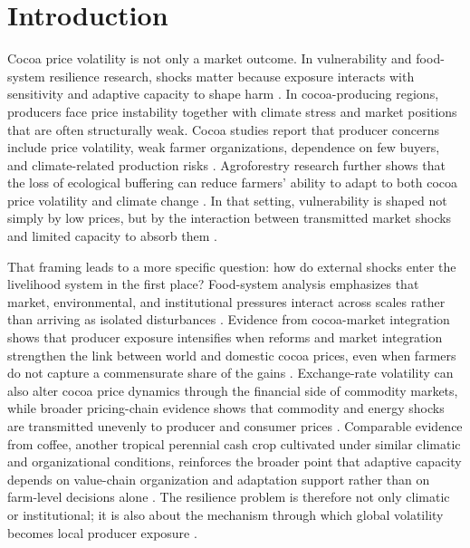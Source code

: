 \documentclass[11pt]{article}
\begin{document}
\section{Introduction}

Cocoa price volatility is not only a market outcome. In vulnerability and food-system resilience research, shocks matter because exposure interacts with sensitivity and adaptive capacity to shape harm \citep{Tendall2015,Zurek2022}. In cocoa-producing regions, producers face price instability together with climate stress and market positions that are often structurally weak. Cocoa studies report that producer concerns include price volatility, weak farmer organizations, dependence on few buyers, and climate-related production risks \citep{Mithofer2017,AkrofiAtitianti2018}. Agroforestry research further shows that the loss of ecological buffering can reduce farmers' ability to adapt to both cocoa price volatility and climate change \citep{Vaast2014}. In that setting, vulnerability is shaped not simply by low prices, but by the interaction between transmitted market shocks and limited capacity to absorb them \citep{Turner2003,Adger2006,TsowouGayi2019}.

That framing leads to a more specific question: how do external shocks enter the livelihood system in the first place? Food-system analysis emphasizes that market, environmental, and institutional pressures interact across scales rather than arriving as isolated disturbances \citep{Ericksen2008,Zurek2022}. Evidence from cocoa-market integration shows that producer exposure intensifies when reforms and market integration strengthen the link between world and domestic cocoa prices, even when farmers do not capture a commensurate share of the gains \citep{TsowouGayi2019}. Exchange-rate volatility can also alter cocoa price dynamics through the financial side of commodity markets, while broader pricing-chain evidence shows that commodity and energy shocks are transmitted unevenly to producer and consumer prices \citep{Jumah2001,JimenezRodriguez2022}. Comparable evidence from coffee, another tropical perennial cash crop cultivated under similar climatic and organizational conditions, reinforces the broader point that adaptive capacity depends on value-chain organization and adaptation support rather than on farm-level decisions alone \citep{Gereffi2005,Morales2022}. The resilience problem is therefore not only climatic or institutional; it is also about the mechanism through which global volatility becomes local producer exposure \citep{Merkle2021}.
\end{document}
